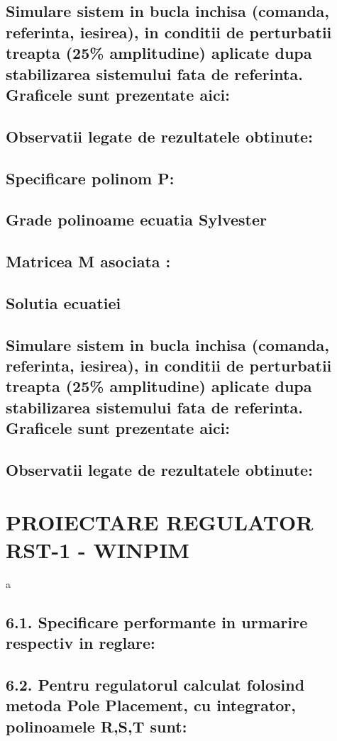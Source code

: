 \documentclass[12pt,english]{article}
\begin{document}
\subsection {Simulare sistem in bucla inchisa (comanda, referinta, iesirea), in conditii de perturbatii treapta (25\% amplitudine) aplicate dupa stabilizarea sistemului fata de referinta. Graficele sunt prezentate aici: }
\subsection {Observatii legate de rezultatele obtinute: }

\subsection {Specificare polinom P: }
\subsection {Grade polinoame ecuatia Sylvester }
\subsection {Matricea M asociata : }
\subsection {Solutia ecuatiei}
\subsection {Simulare sistem in bucla inchisa (comanda, referinta, iesirea), in conditii de perturbatii treapta (25\% amplitudine) aplicate dupa stabilizarea sistemului fata de referinta. Graficele sunt prezentate aici: }
\subsection {Observatii legate de rezultatele obtinute: }

\section {PROIECTARE REGULATOR RST-1 - WINPIM }
a
\subsection {6.1. Specificare performante in urmarire respectiv in reglare: }
\subsection {6.2. Pentru regulatorul calculat folosind metoda Pole Placement, cu integrator, polinoamele R,S,T sunt: }
\end{document}
